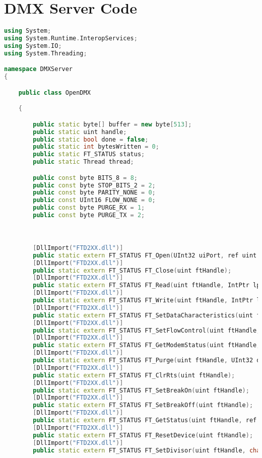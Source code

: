 \chapter{DMX Server Code}\label{appendix:dmx_server}

\begin{lstlisting}[language=C++]
using System;
using System.Runtime.InteropServices;
using System.IO;
using System.Threading;

namespace DMXServer
{

    public class OpenDMX

    {

        public static byte[] buffer = new byte[513];
        public static uint handle;
        public static bool done = false;
        public static int bytesWritten = 0;
        public static FT_STATUS status;
        public static Thread thread;

        public const byte BITS_8 = 8;
        public const byte STOP_BITS_2 = 2;
        public const byte PARITY_NONE = 0;
        public const UInt16 FLOW_NONE = 0;
        public const byte PURGE_RX = 1;
        public const byte PURGE_TX = 2;



        [DllImport("FTD2XX.dll")]
        public static extern FT_STATUS FT_Open(UInt32 uiPort, ref uint ftHandle);
        [DllImport("FTD2XX.dll")]
        public static extern FT_STATUS FT_Close(uint ftHandle);
        [DllImport("FTD2XX.dll")]
        public static extern FT_STATUS FT_Read(uint ftHandle, IntPtr lpBuffer, UInt32 dwBytesToRead, ref UInt32 lpdwBytesReturned);
        [DllImport("FTD2XX.dll")]
        public static extern FT_STATUS FT_Write(uint ftHandle, IntPtr lpBuffer, UInt32 dwBytesToRead, ref UInt32 lpdwBytesWritten);
        [DllImport("FTD2XX.dll")]
        public static extern FT_STATUS FT_SetDataCharacteristics(uint ftHandle, byte uWordLength, byte uStopBits, byte uParity);
        [DllImport("FTD2XX.dll")]
        public static extern FT_STATUS FT_SetFlowControl(uint ftHandle, char usFlowControl, byte uXon, byte uXoff);
        [DllImport("FTD2XX.dll")]
        public static extern FT_STATUS FT_GetModemStatus(uint ftHandle, ref UInt32 lpdwModemStatus);
        [DllImport("FTD2XX.dll")]
        public static extern FT_STATUS FT_Purge(uint ftHandle, UInt32 dwMask);
        [DllImport("FTD2XX.dll")]
        public static extern FT_STATUS FT_ClrRts(uint ftHandle);
        [DllImport("FTD2XX.dll")]
        public static extern FT_STATUS FT_SetBreakOn(uint ftHandle);
        [DllImport("FTD2XX.dll")]
        public static extern FT_STATUS FT_SetBreakOff(uint ftHandle);
        [DllImport("FTD2XX.dll")]
        public static extern FT_STATUS FT_GetStatus(uint ftHandle, ref UInt32 lpdwAmountInRxQueue, ref UInt32 lpdwAmountInTxQueue, ref UInt32 lpdwEventStatus);
        [DllImport("FTD2XX.dll")]
        public static extern FT_STATUS FT_ResetDevice(uint ftHandle);
        [DllImport("FTD2XX.dll")]
        public static extern FT_STATUS FT_SetDivisor(uint ftHandle, char usDivisor);



\end{lstlisting}
